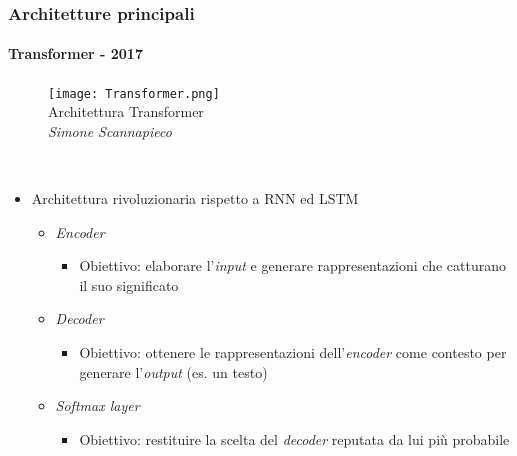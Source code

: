 \begin{frame}[t] \frametitle{Architetture principali}
\framesubtitle{Transformer - 2017}
{\scriptsize
{}
	\begin{minipage}[t]{\textwidth}
		\vspace*{-.5cm}
		\begin{figure}
			\centering
			\texttt{[image: Transformer.png]}
			{\tiny\\Architettura Transformer\\\textit{\textcopyright Simone Scannapieco}}
		\end{figure}
	\end{minipage}
	\\\vspace*{.3cm}
	\begin{minipage}[t]{\textwidth}
		\begin{itemize}[leftmargin=10pt,align=right]
			\item[\alert{\faArrowCircleRight}] Architettura rivoluzionaria rispetto a RNN ed LSTM
			\begin{itemize}[leftmargin=10pt,align=right]
				\onslide<2->\item[\alert{\faArrowCircleRight}] \alert{\emph{Encoder}}
				\begin{itemize}[leftmargin=10pt,align=right]
					\item[\alert{\faArrowCircleRight}] \alert{Obiettivo:} elaborare l'\emph{input} e generare rappresentazioni che catturano il suo significato
				\end{itemize}
				\item[\alert{\faArrowCircleRight}] \alert{\emph{Decoder}}
				\begin{itemize}[leftmargin=10pt,align=right]
					\item[\alert{\faArrowCircleRight}] \alert{Obiettivo:} ottenere le rappresentazioni dell'\emph{encoder} come \alert{contesto} per generare l'\emph{output} (es. un testo)
				\end{itemize}
				\item[\alert{\faArrowCircleRight}] \alert{\emph{Softmax layer}}
				\begin{itemize}[leftmargin=10pt,align=right]
					\item[\alert{\faArrowCircleRight}] \alert{Obiettivo:} restituire la scelta del \emph{decoder} reputata da lui più probabile
				\end{itemize}
			\end{itemize}
		\end{itemize}
	\end{minipage}
}
\end{frame}

